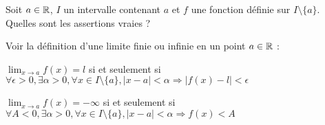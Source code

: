 \begin{question}

Soit $a\in \mathbb{R}$, $I$ un intervalle contenant $a$ et $f$ une fonction définie sur $I \setminus\{a\}$. Quelles sont les assertions vraies ?
\begin{answers}

    
    
    
    
\end{answers}
\begin{explanations}
Voir la définition d'une limite finie ou infinie en un point $a\in\mathbb{R}$ :

 $\lim_{x\to a} f(x)=l$ si et seulement si  $\forall \epsilon >0,  \exists \alpha > 0, \forall x \in I\setminus\{a\}, |x-a| < \alpha \Rightarrow |f(x)-l|<\epsilon$
 
 $\lim_{x\to a} f(x)=-\infty$ si et seulement si $\forall A < 0,  \exists \alpha > 0, \forall x \in I\setminus\{a\}, |x-a| < \alpha \Rightarrow f(x) < A$
 
\end{explanations}

\end{question}


